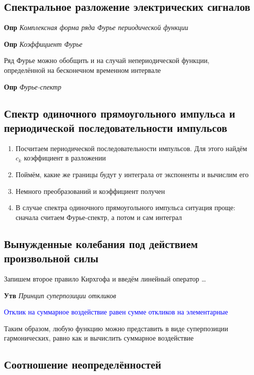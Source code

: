\documentclass[a4paper, 14pt]{article}
\begin{document}
    \subsection{Спектральное разложение электрических сигналов}
    
    \textbf{Опр} \textit{Комплексная форма ряда Фурье периодической функции}
    
    \textbf{Опр} \textit{Коэффициент Фурье}
    
    Ряд Фурье можно обобщить и на случай непериодической функции, определённой на бесконечном временном интервале
    
    \textbf{Опр} \textit{Фурье-спектр}
    
    \subsection{Спектр одиночного прямоугольного импульса и периодической последовательности импульсов}
    
    \begin{enumerate}
        \item Посчитаем периодической последовательности импульсов.
        Для этого найдём $c_k$ коэффициент в разложении
        \item Поймём, какие же границы будут у интеграла от экспоненты и вычислим его
        \item Немного преобразований и коэффициент получен
        \item В случае спектра одиночного прямоугольного импульса ситуация проще: сначала считаем Фурье-спектр, а
        потом и сам интеграл
    \end{enumerate}
    
    \subsection{Вынужденные колебания под действием произвольной силы}
    
    Запишем второе правило Кирхгофа и введём линейный оператор \ldots
    
    \textbf{Утв} \textit{Принцип суперпозиции откликов}
    
    \textcolor{blue}{Отклик на суммарное воздействие равен сумме откликов на элементарные}
    
    Таким образом, любую функцию можно представить в виде суперпозиции гармонических, равно как и вычислить суммарное
    воздействие
    
    \subsection{Соотношение неопределённостей}
    
\end{document}
